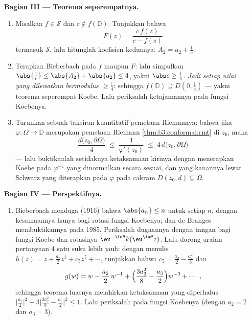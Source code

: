 \begin{problem}
\medskip
\noindent\textbf{Bagian III --- Teorema seperempatnya.}
\begin{enumerate}[resume]
  \item Misalkan $f \in \mathcal S$ dan $c \notin f(\mathbb D)$.
        Tunjukkan bahwa
        \[
        F(z) = \frac{c\,f(z)}{c - f(z)}
        \]
        termasuk $\mathcal S$, lalu hitunglah koefisien
        keduanya: $A_2 = a_2 + \frac1c$.
  \item Terapkan Bieberbach pada $f$ maupun $F$: lalu simpulkan
        $\abs{\frac1c} \leq \abs{A_2} + \abs{a_2} \leq 4$,
        yakni $\abs c \geq \frac14$. \emph{Jadi setiap nilai yang dilewatkan
        bermodulus $\geq \frac14$}: sehingga $f(\mathbb D) \supseteq
        D(0, \frac14)$ --- yakni teorema seperempat Koebe. Lalu periksalah
        ketajamannya pada fungsi Koebenya.
  \item Turunkan sebuah taksiran kuantitatif pemetaan Riemannya: bahwa jika
        $\varphi \colon \Omega \to \mathbb D$ merupakan pemetaan Riemann
        \cref{thm:b3:conformal:rmt} di $z_0$, maka
        \[
        \frac{d\bigl(z_0, \partial\Omega\bigr)}{4}
        \;\leq\; \frac1{\varphi'(z_0)} \;\leq\;
        4\,d\bigl(z_0, \partial\Omega\bigr)
        \]
        --- lalu buktikanlah setidaknya ketaksamaan kirinya dengan menerapkan
        Koebe pada $\varphi^{-1}$ yang dinormalkan secara sesuai, dan
        yang kanannya lewat Schwarz yang diterapkan pada $\varphi$ pada cakram
        $D(z_0, d) \subseteq \Omega$.
\end{enumerate}

\medskip
\noindent\textbf{Bagian IV --- Perspektifnya.}
\begin{enumerate}[resume]
  \item Bieberbach menduga (1916) bahwa $\abs{a_n} \leq n$ untuk
        setiap $n$, dengan kesamaannya hanya bagi rotasi
        fungsi Koebenya; dan de Branges membuktikannya pada 1985. Periksalah
        dugaannya dengan tangan bagi fungsi Koebe dan
        rotasinya $\eu^{-\iu\theta}k(\eu^{\iu\theta}z)$. Lalu
        dorong uraian pertanyaan 4 satu suku lebih jauh: dengan menulis
        $h(z) = z + \frac{a_2}2z^3 + c_5z^5 + \cdots$, tunjukkan bahwa
        $c_5 = \frac{a_3}2 - \frac{a_2^2}8$ dan
        \[
        g(w) = w - \frac{a_2}{2}\,w^{-1} +
        \Bigl(\frac{3a_2^2}8 - \frac{a_3}2\Bigr)w^{-3} +
        \cdots ,
        \]
        sehingga teorema luasnya melahirkan ketaksamaan yang diperhalus
        $\bigl|\frac{a_2}2\bigr|^2 + 3\bigl|\frac{3a_2^2}8 -
        \frac{a_3}2\bigr|^2 \leq 1$. Lalu periksalah pada fungsi
        Koebenya (dengan $a_2 = 2$ dan $a_3 = 3$).
\end{enumerate}


\end{problem}
